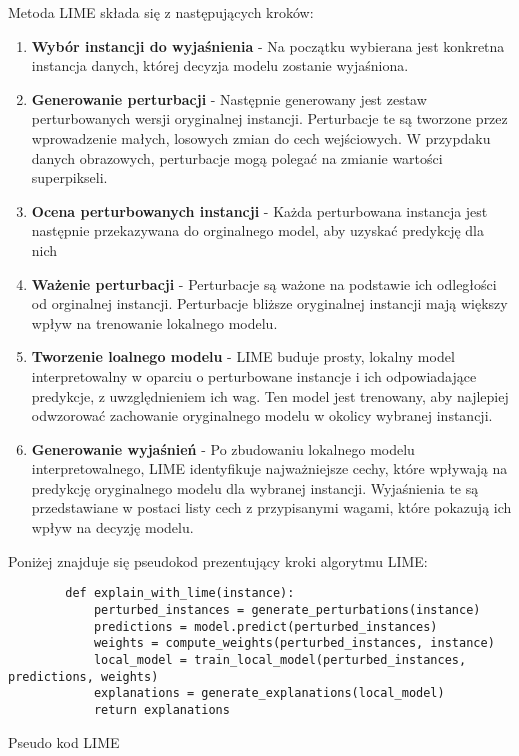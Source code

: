 Metoda LIME składa się z następujących kroków:
\begin{enumerate}
	\item \textbf{Wybór instancji do wyjaśnienia} - Na początku wybierana jest konkretna instancja danych, której decyzja modelu zostanie  wyjaśniona.
	\item \textbf{Generowanie perturbacji} - Następnie generowany jest zestaw perturbowanych wersji oryginalnej instancji.
	      Perturbacje te są tworzone przez wprowadzenie małych, losowych zmian do cech wejściowych.
	      W przypdaku danych obrazowych, perturbacje mogą polegać na zmianie wartości superpikseli.
	\item \textbf{Ocena perturbowanych instancji} - Każda perturbowana instancja jest następnie przekazywana do orginalnego model, aby uzyskać predykcję dla nich
	\item \textbf{Ważenie perturbacji} - Perturbacje są ważone na podstawie ich odległości od orginalnej instancji.
	      Perturbacje bliższe oryginalnej instancji mają większy wpływ na trenowanie lokalnego modelu.
	\item \textbf{Tworzenie loalnego modelu} - LIME buduje prosty, lokalny model interpretowalny w oparciu o perturbowane instancje i ich odpowiadające predykcje, z uwzględnieniem ich wag.
	      Ten model jest trenowany, aby najlepiej odwzorować zachowanie oryginalnego modelu w okolicy wybranej instancji.
	\item \textbf{Generowanie wyjaśnień} - Po zbudowaniu lokalnego modelu interpretowalnego, LIME identyfikuje najważniejsze cechy, które wpływają na predykcję oryginalnego modelu dla wybranej instancji.
	      Wyjaśnienia te są przedstawiane w postaci listy cech z przypisanymi wagami, które pokazują ich wpływ na decyzję modelu.
\end{enumerate}

Poniżej znajduje się pseudokod prezentujący kroki algorytmu LIME:
\begin{listing}
	\begin{verbatim}
        def explain_with_lime(instance):
            perturbed_instances = generate_perturbations(instance)
            predictions = model.predict(perturbed_instances)
            weights = compute_weights(perturbed_instances, instance)
            local_model = train_local_model(perturbed_instances, predictions, weights)
            explanations = generate_explanations(local_model)
            return explanations
  \end{verbatim}
	\caption{Pseudo kod LIME} \label{listing:lime}
\end{listing}

